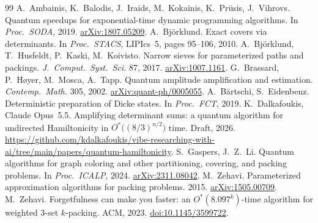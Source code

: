 \documentclass[11pt,a4paper]{article}
\theoremstyle{plain}
\theoremstyle{remark}
\newcommand{\Ostar}{O^{*}}
\begin{document}
\begin{thebibliography}{99}
 A.~Ambainis, K.~Balodis, J.~Iraids, M.~Kokainis, K.~Pr\={u}sis, J.~Vihrovs. Quantum speedups for exponential-time dynamic programming algorithms. In \emph{Proc.\ SODA}, 2019. \href{https://arxiv.org/abs/1807.05209}{arXiv:1807.05209}.
 A.~Björklund. Exact covers via determinants. In \emph{Proc.\ STACS}, LIPIcs~5, pages 95--106, 2010.
 A.~Björklund, T.~Husfeldt, P.~Kaski, M.~Koivisto. Narrow sieves for parameterized paths and packings. \emph{J.\ Comput.\ Syst.\ Sci.} 87, 2017. \href{https://arxiv.org/abs/1007.1161}{arXiv:1007.1161}.
 G.~Brassard, P.~H{\o}yer, M.~Mosca, A.~Tapp. Quantum amplitude amplification and estimation. \emph{Contemp.\ Math.} 305, 2002. \href{https://arxiv.org/abs/quant-ph/0005055}{arXiv:quant-ph/0005055}.
 A.~B{\"a}rtschi, S.~Eidenbenz. Deterministic preparation of Dicke states. In \emph{Proc.\ FCT}, 2019.
 K.~Dalkafoukis, Claude Opus~5.5. Amplifying determinant sums: a quantum algorithm for undirected Hamiltonicity in $\Ostar\big((8/3)^{n/2}\big)$ time. Draft, 2026. \url{https://github.com/kdalkafoukis/vibe-researching-with-ai/tree/main/papers/quantum-hamiltonicity}.
 S.~Gaspers, J.~Z.~Li. Quantum algorithms for graph coloring and other partitioning, covering, and packing problems. In \emph{Proc.\ ICALP}, 2024. \href{https://arxiv.org/abs/2311.08042}{arXiv:2311.08042}.
 M.~Zehavi. Parameterized approximation algorithms for packing problems. 2015. \href{https://arxiv.org/abs/1505.00709}{arXiv:1505.00709}.
 M.~Zehavi. Forgetfulness can make you faster: an $\Ostar(8.097^k)$-time algorithm for weighted 3-set $k$-packing. ACM, 2023. \href{https://doi.org/10.1145/3599722}{doi:10.1145/3599722}.
\end{thebibliography}
\end{document}
